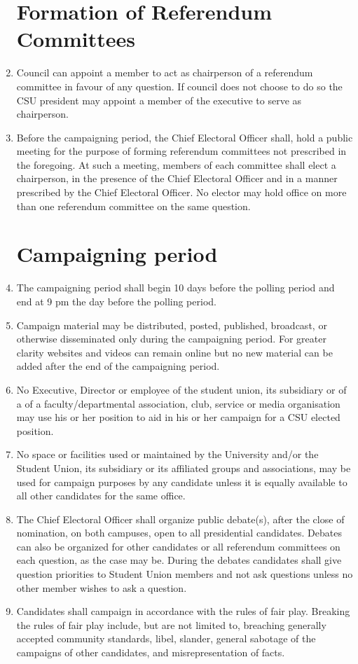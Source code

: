 \documentclass[oneside]{book}
\begin{document}
\begin{enumerate}
\section{\label{Formation_of_Referendum_Committees}Formation of Referendum
Committees }
\item Council can appoint a member to act as chairperson of a referendum
committee in favour of any question. If council does not choose to
do so the CSU president may appoint a member of the executive to serve
as chairperson. 
\item Before the campaigning period, the Chief Electoral Officer shall,
hold a public meeting for the purpose of forming referendum committees
not prescribed in the foregoing. At such a meeting, members of each
committee shall elect a chairperson, in the presence of the Chief
Electoral Officer and in a manner prescribed by the Chief Electoral
Officer. No elector may hold office on more than one referendum committee
on the same question. 

\section{\label{Campaigning_period}Campaigning period }
\item The campaigning period shall begin 10 days before the polling period
and end at 9 pm the day before the polling period. 
\item Campaign material may be distributed, posted, published, broadcast,
or otherwise disseminated only during the campaigning period. For
greater clarity websites and videos can remain online but no new material
can be added after the end of the campaigning period. 
\item No Executive, Director or employee of the student union, its subsidiary
or of a of a faculty/departmental association, club, service or media
organisation may use his or her position to aid in his or her campaign
for a CSU elected position. 
\item No space or facilities used or maintained by the University and/or
the Student Union, its subsidiary or its affiliated groups and associations,
may be used for campaign purposes by any candidate unless it is equally
available to all other candidates for the same office. 
\item The Chief Electoral Officer shall organize public debate(s), after
the close of nomination, on both campuses, open to all presidential
candidates. Debates can also be organized for other candidates or
all referendum committees on each question, as the case may be. During
the debates candidates shall give question priorities to Student Union
members and not ask questions unless no other member wishes to ask
a question. 
\item Candidates shall campaign in accordance with the rules of fair play.
Breaking the rules of fair play include, but are not limited to, breaching
generally accepted community standards, libel, slander, general sabotage
of the campaigns of other candidates, and misrepresentation of facts. 


\end{enumerate}
\end{document}
